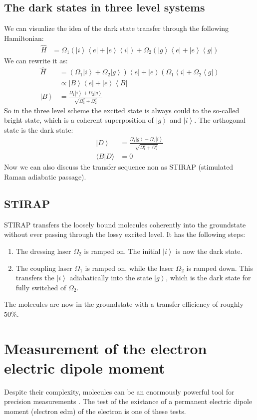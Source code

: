 \documentclass[10pt]{article}
\let\cite\citep
\providecommand\citep{\cite}
\newcommand{\bra}[1]{\ensuremath{\left\langle#1\right|}}
\newcommand{\ket}[1]{\ensuremath{\left|#1\right\rangle}}
\begin{document}
\subsection{The dark states in three level systems}
We can visualize the idea of the dark state transfer through the following Hamiltonian:
\begin{align}
\hat{H}&= \Omega_1\left(\ket{i}\bra{e}+\ket{e}\bra{i}\right)+\Omega_2\left(\ket{g}\bra{e}+\ket{e}\bra{g}\right)
\end{align}
We can rewrite it as:
\begin{align}
\hat{H}&= (\Omega_1\ket{i}+\Omega_2\ket{g})\bra{e}+\ket{e}(\Omega_1\bra{i}+\Omega_2\bra{g})\\
&\propto\ket{B}\bra{e}+\ket{e}\bra{B}\\
\ket{B}&= \frac{\Omega_1\ket{i}+\Omega_2\ket{g}}{\sqrt{\Omega_1^2+\Omega_2^2}}
\end{align}
So in the three level scheme the excited state is always could to the so-called bright state, which is a coherent superposition of $\ket{g}$ and $\ket{i}$. The orthogonal state is the dark state:
\begin{align}
\ket{D}&= \frac{\Omega_1\ket{g}-\Omega_2\ket{i}}{\sqrt{\Omega_1^2+\Omega_2^2}}\\
\langle B| D\rangle &= 0
\end{align}
Now we can also discuss the transfer sequence non as STIRAP (stimulated Raman adiabatic passage).

\subsection{STIRAP}

STIRAP transfers the loosely bound molecules coherently into the groundstate without ever passing through the lossy excited level. It has the following steps:
\begin{enumerate}
\item The dressing laser $\Omega_2$ is ramped on. The initial $\ket{i}$ is now the dark state.
\item The coupling laser $\Omega_1$ is ramped on, while the laser $\Omega_2$ is ramped down. This transfers the $\ket{i}$ adiabatically into the state $\ket{g}$, which is the dark state for fully switched of $\Omega_2$. 
\end{enumerate}
The molecules are now in the groundstate with a transfer efficiency of roughly $50\%$.

\section{Measurement of the electron electric dipole moment}
Despite their complexity, molecules can be an enormously powerful tool for precision measurements \cite{Safronova_2018,particles}. The test of the existance of a permanent electric dipole moment (electron edm) of the electron is one of these tests. 
\end{document}
